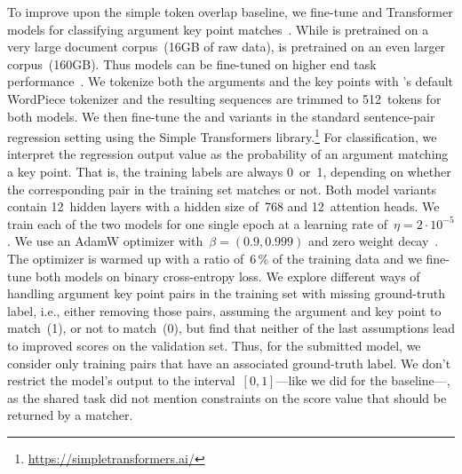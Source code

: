 To improve upon the simple token overlap baseline, we fine-tune \Bert and \Roberta Transformer models for classifying argument key point matches~\cite{DevlinCLT2019,LiuOGDJCLLZS2019}.
While \Bert is pretrained on a very large document corpus~(16GB of raw data), \Roberta is pretrained on an even larger corpus~(160GB).
Thus \Roberta models can be fine-tuned on higher end task performance~\cite{LiuOGDJCLLZS2019}.
We tokenize both the arguments and the key points with \Bert's default WordPiece tokenizer and the resulting sequences are trimmed to 512~tokens for both models.
We then fine-tune the \BertBase and \RobertaBase variants in the standard sentence-pair regression setting using the Simple Transformers library.\footnote{\url{https://simpletransformers.ai/}}
For classification, we interpret the regression output value as the probability of an argument matching a key point.
That is, the training labels are always 0~or~1, depending on whether the corresponding pair in the training set matches or not.
Both model variants contain 12~hidden layers with a hidden size of~768 and 12~attention heads.
We train each of the two models for one single epoch at a learning rate of~\( \eta = 2 \cdot 10^{-5} \).
We use an AdamW optimizer with~\( \beta = (0.9, 0.999) \) and zero weight decay~\cite{LoshchilovH2019}.
The optimizer is warmed up with a ratio of~6\,\% of the training data and we fine-tune both models on binary cross-entropy loss.
We explore different ways of handling argument key point pairs in the training set with missing ground-truth label, i.e., either removing those pairs, assuming the argument and key point to match~(1), or not to match~(0), but find that neither of the last assumptions lead to improved scores on the validation set.
Thus, for the submitted model, we consider only training pairs that have an associated ground-truth label.
We don't restrict the model's output to the interval~\([0,1]\)---like we did for the baseline---, as the shared task did not mention constraints on the score value that should be returned by a matcher.
